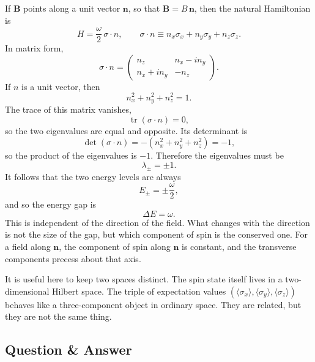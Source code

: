 If \(\mathbf{B}\) points along a unit vector \(\mathbf{n}\), so that \(\mathbf{B}=B\,\mathbf{n}\), then the natural Hamiltonian is
\begin{equation}
H = \frac{\omega}{2}\,\sigma\cdot n,
\qquad
\sigma\cdot n \equiv n_x\sigma_x + n_y\sigma_y + n_z\sigma_z.
\end{equation}
In matrix form,
\begin{equation}
\sigma\cdot n
=
\begin{pmatrix}
n_z & n_x - i n_y \\
n_x + i n_y & -n_z
\end{pmatrix}.
\end{equation}
If \(n\) is a unit vector, then
\begin{equation}
n_x^2+n_y^2+n_z^2=1.
\end{equation}
The trace of this matrix vanishes,
\begin{equation}
\operatorname{tr}(\sigma\cdot n)=0,
\end{equation}
so the two eigenvalues are equal and opposite. Its determinant is
\begin{equation}
\det(\sigma\cdot n)=-(n_x^2+n_y^2+n_z^2)=-1,
\end{equation}
so the product of the eigenvalues is \(-1\). Therefore the eigenvalues must be
\begin{equation}
\lambda_\pm = \pm 1.
\end{equation}
It follows that the two energy levels are always
\begin{equation}
E_\pm = \pm \frac{\omega}{2},
\end{equation}
and so the energy gap is
\begin{equation}
\Delta E = \omega.
\end{equation}
This is independent of the direction of the field. What changes with the direction is not the size of the gap, but which component of spin is the conserved one. For a field along \(\mathbf{n}\), the component of spin along \(\mathbf{n}\) is constant, and the transverse components precess about that axis.

It is useful here to keep two spaces distinct. The spin state itself lives in a two-dimensional Hilbert space. The triple of expectation values \((\langle \sigma_x\rangle,\langle \sigma_y\rangle,\langle \sigma_z\rangle)\) behaves like a three-component object in ordinary space. They are related, but they are not the same thing.

\subsection{Question \& Answer}

